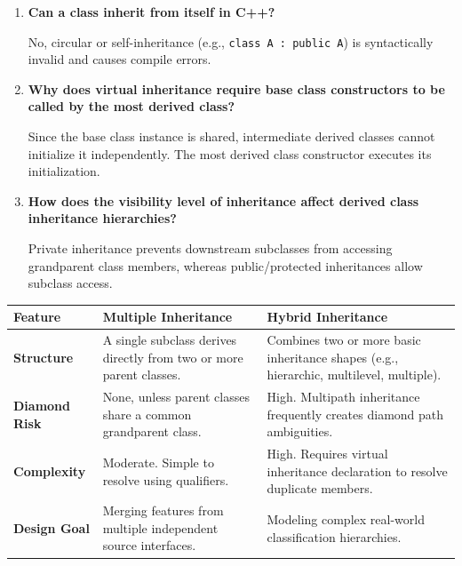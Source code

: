 \documentclass[12pt,a4paper]{article}
\newcommand{\Q}[1]{\textbf{#1}\par\noindent\ignorespaces}
\renewcommand{\arraystretch}{1.45}
\begin{document}
\begin{tcolorbox}[exambox, title={\textbf{Frequently Asked / Viva Questions}}]
\begin{enumerate}[topsep=0pt, label=\textbf{Q\arabic*.}, itemsep=5pt]
  \item \Q{Can a class inherit from itself in C++?}
    No, circular or self-inheritance (e.g., \texttt{class A : public A}) is syntactically invalid and causes compile errors.
  \item \Q{Why does virtual inheritance require base class constructors to be called by the most derived class?}
    Since the base class instance is shared, intermediate derived classes cannot initialize it independently. The most derived class constructor executes its initialization.
  \item \Q{How does the visibility level of inheritance affect derived class inheritance hierarchies?}
    Private inheritance prevents downstream subclasses from accessing grandparent class members, whereas public/protected inheritances allow subclass access.
\end{enumerate}
\end{tcolorbox}

\begin{tcolorbox}[tikzbox, title={Comparison: Multiple Inheritance vs. Hybrid Inheritance}]
\renewcommand{\arraystretch}{1.45}
\par\noindent
\begin{tabularx}{\linewidth}{|B{3.2cm}|Y|Y|}
\hline
\textbf{Feature} & \textbf{\color{myteal}Multiple Inheritance} & \textbf{\color{myamber}Hybrid Inheritance} \\
\hline
\textbf{Structure} & A single subclass derives directly from two or more parent classes. & Combines two or more basic inheritance shapes (e.g., hierarchic, multilevel, multiple). \\
\hline
\textbf{Diamond Risk} & None, unless parent classes share a common grandparent class. & High. Multipath inheritance frequently creates diamond path ambiguities. \\
\hline
\textbf{Complexity} & Moderate. Simple to resolve using qualifiers. & High. Requires virtual inheritance declaration to resolve duplicate members. \\
\hline
\textbf{Design Goal} & Merging features from multiple independent source interfaces. & Modeling complex real-world classification hierarchies. \\
\hline
\end{tabularx}
\end{tcolorbox}
\end{document}
